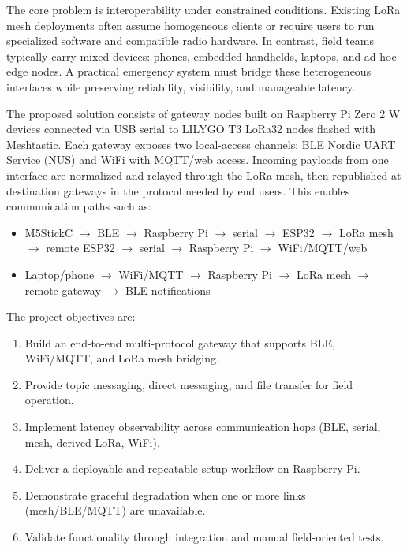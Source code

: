 \documentclass[conference]{IEEEtran}
\begin{document}
The core problem is interoperability under constrained conditions. Existing LoRa mesh deployments often assume homogeneous clients or require users to run specialized software and compatible radio hardware. In contrast, field teams typically carry mixed devices: phones, embedded handhelds, laptops, and ad hoc edge nodes. A practical emergency system must bridge these heterogeneous interfaces while preserving reliability, visibility, and manageable latency.

The proposed solution consists of gateway nodes built on Raspberry Pi Zero 2 W devices connected via USB serial to LILYGO T3 LoRa32 nodes flashed with Meshtastic. Each gateway exposes two local-access channels: BLE Nordic UART Service (NUS) and WiFi with MQTT/web access. Incoming payloads from one interface are normalized and relayed through the LoRa mesh, then republished at destination gateways in the protocol needed by end users. This enables communication paths such as:

\begin{itemize}
\item M5StickC $\rightarrow$ BLE $\rightarrow$ Raspberry Pi $\rightarrow$ serial $\rightarrow$ ESP32 $\rightarrow$ LoRa mesh $\rightarrow$ remote ESP32 $\rightarrow$ serial $\rightarrow$ Raspberry Pi $\rightarrow$ WiFi/MQTT/web
\item Laptop/phone $\rightarrow$ WiFi/MQTT $\rightarrow$ Raspberry Pi $\rightarrow$ LoRa mesh $\rightarrow$ remote gateway $\rightarrow$ BLE notifications
\end{itemize}

The project objectives are:
\begin{enumerate}
\item Build an end-to-end multi-protocol gateway that supports BLE, WiFi/MQTT, and LoRa mesh bridging.
\item Provide topic messaging, direct messaging, and file transfer for field operation.
\item Implement latency observability across communication hops (BLE, serial, mesh, derived LoRa, WiFi).
\item Deliver a deployable and repeatable setup workflow on Raspberry Pi.
\item Demonstrate graceful degradation when one or more links (mesh/BLE/MQTT) are unavailable.
\item Validate functionality through integration and manual field-oriented tests.
\end{enumerate}
\end{document}
